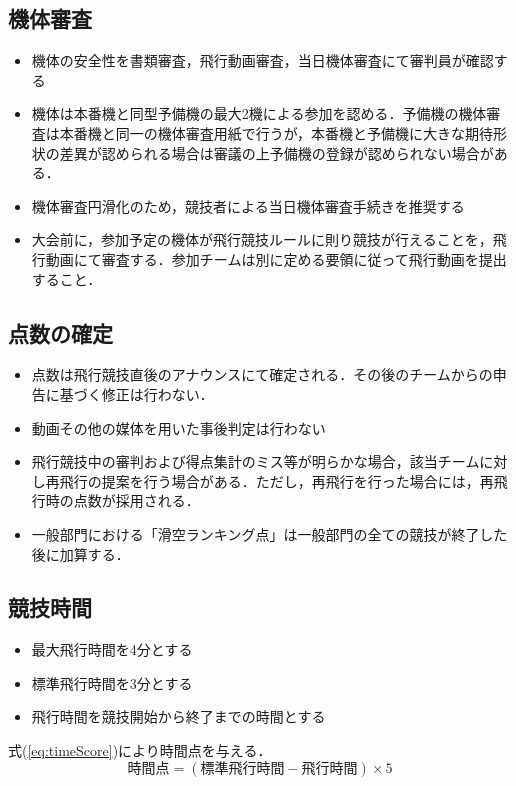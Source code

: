 \documentclass[a4paper,12pt,oneside]{jsarticle}
\begin{document}
\subsection{機体審査}
\begin{itemize}
  \item 機体の安全性を書類審査，飛行動画審査，当日機体審査にて審判員が確認する
  \item 機体は本番機と同型予備機の最大2機による参加を認める．予備機の機体審査は本番機と同一の機体審査用紙で行うが，本番機と予備機に大きな期待形状の差異が認められる場合は審議の上予備機の登録が認められない場合がある．
  \item 機体審査円滑化のため，競技者による当日機体審査手続きを推奨する
  \item 大会前に，参加予定の機体が飛行競技ルールに則り競技が行えることを，飛行動画にて審査する．参加チームは別に定める要領に従って飛行動画を提出すること．
\end{itemize}

\subsection{点数の確定}
\begin{itemize}
  \item 点数は飛行競技直後のアナウンスにて確定される．その後のチームからの申告に基づく修正は行わない．
  \item 動画その他の媒体を用いた事後判定は行わない
  \item 飛行競技中の審判および得点集計のミス等が明らかな場合，該当チームに対し再飛行の提案を行う場合がある．ただし，再飛行を行った場合には，再飛行時の点数が採用される．
  \item 一般部門における「滑空ランキング点」は一般部門の全ての競技が終了した後に加算する．
\end{itemize}

\subsection{競技時間}
\begin{itemize}
  \item 最大飛行時間を4分とする
  \item 標準飛行時間を3分とする
  \item 飛行時間を競技開始から終了までの時間とする
\end{itemize}
式(\ref{eq:timeScore})により時間点を与える．
\begin{equation}\label{eq:timeScore}
  時間点 = (標準飛行時間 - 飛行時間)\times 5
\end{equation}
\end{document}
